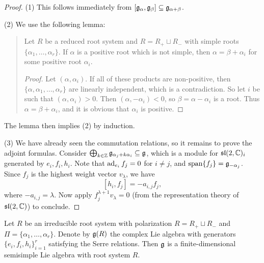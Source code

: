 \begin{proof}
  (1) This follows immediately
  from $[\mathfrak{g}_\alpha, \mathfrak{g}_\beta] \subseteq \mathfrak{g}_{\alpha + \beta}$.

  (2) We use the following lemma:
  \begin{quote}
    \vspace{-2em}
    \begin{lemma}
      Let $R$ be a reduced root system
      and $R = R_+ \sqcup R_-$
      with simple roots
      $\{\alpha_1, \dots, \alpha_r\}$.
      If $\alpha$ is a positive
      root which is not simple, then
      $\alpha = \beta + \alpha_i$
      for some positive root $\alpha_i$.
    \end{lemma}

    \begin{proof}
      Let $(\alpha, \alpha_i)$. If
      all of these products are
      non-positive, then
      $\{\alpha, \alpha_1, \dots, \alpha_r\}$
      are linearly independent, which
      is a contradiction. So let
      $i$ be such that
      $(\alpha, \alpha_i) > 0$.
      Then $(\alpha, -\alpha_i) < 0$,
      so $\beta = \alpha - \alpha_i$ is
      a root. Thus
      $\alpha = \beta + \alpha_i$,
      and it is obvious that $\alpha_i$
      is positive.
    \end{proof}
  \end{quote}
  The lemma then implies (2) by
  induction.

  (3) We have already seen the
  commutation relations, so
  it remains to prove the
  adjoint formulas. Consider
  $\bigoplus_{k \in \mathbb{Z}} \mathfrak{g}_{\alpha_j + k\alpha_i} \subseteq \mathfrak{g}$,
  which is a module for
  $\mathfrak{sl}(2, \mathbb{C})_i$
  generated by $e_i, f_i, h_i$.
  Note that $\operatorname{ad}_{e_i} f_j = 0$ for $i \ne j$,
  and $\mathrm{span}\{f_j\} = \mathfrak{g}_{-\alpha_j}$.
  Since $f_j$ is the highest
  weight vector $v_\lambda$, we have
  \[
    [h_i, f_j] = -a_{i, j} f_j,
  \]
  where $-a_{i, j} = \lambda$.
  Now apply $f_j^{\lambda + 1} v_\lambda = 0$
  (from the representation theory of
  $\mathfrak{sl}(2, \mathbb{C})$)
  to conclude.
\end{proof}

\begin{theorem}
  Let $R$ be an irreducible root
  system with polarization
  $R = R_+ \sqcup R_-$ and
  $\Pi = \{\alpha_1, \dots, \alpha_r\}$.
  Denote by $\mathfrak{g}(R)$ the complex
  Lie algebra with generators
  $\{e_i, f_i, h_i\}_{i = 1}^r$
  satisfying the Serre relations.
  Then $\mathfrak{g}$ is a finite-dimensional
  semisimple Lie algebra
  with root system $R$.
\end{theorem}

